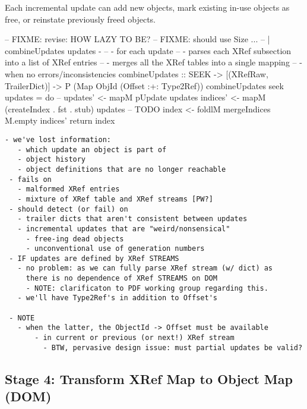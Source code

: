 Each incremental update can add new objects, mark existing in-use objects as
free, or reinstate previously freed objects.

\begin{code}
-- FIXME: revise: HOW LAZY TO BE?
-- FIXME: should use Size ...
-- | combineUpdates updates - 
--   - for each update
--     - parses each XRef subsection into a list of XRef entries
--   - merges all the XRef tables into a single mapping
--     - when no errors/inconsistencies
combineUpdates
  :: SEEK -> [(XRefRaw, TrailerDict)] -> P (Map ObjId (Offset :+: Type2Ref))
combineUpdates seek updates =
    do
    -- updates' <- mapM pUpdate updates  
    indices' <- mapM (createIndex . fst . stub) updates -- TODO
    index    <- foldlM mergeIndices M.empty indices'
    return index
\end{code}

\begin{lstlisting}[style=meta]
 - we've lost information:
   - which update an object is part of
   - object history
   - object definitions that are no longer reachable
 - fails on
   - malformed XRef entries
   - mixture of XRef table and XRef streams [PW?]
 - should detect (or fail) on
   - trailer dicts that aren't consistent between updates
   - incremental updates that are "weird/nonsensical"
     - free-ing dead objects
     - unconventional use of generation numbers
 - IF updates are defined by XRef STREAMS
   - no problem: as we can fully parse XRef stream (w/ dict) as
     there is no dependence of XRef STREAMS on DOM
     - NOTE: clarificaton to PDF working group regarding this.
   - we'll have Type2Ref's in addition to Offset's
      
 - NOTE 
   - when the latter, the ObjectId -> Offset must be available
       - in current or previous (or next!) XRef stream
         - BTW, pervasive design issue: must partial updates be valid?
\end{lstlisting}


\subsection{Stage 4: Transform XRef Map to Object Map (DOM)}

